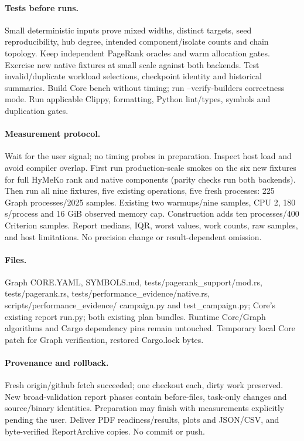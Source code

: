 \documentclass[11pt]{article}
\begin{document}
\paragraph{Tests before runs.} Small deterministic inputs prove mixed widths,
distinct targets, seed reproducibility, hub degree, intended component/isolate
counts and chain topology. Keep independent PageRank oracles and warm allocation
gates. Exercise new native fixtures at small scale against both backends. Test
invalid/duplicate workload selections, checkpoint identity and historical summaries.
Build Core bench without timing; run --verify-builders correctness mode.
Run applicable Clippy, formatting, Python lint/types, symbols and duplication gates.
\paragraph{Measurement protocol.} Wait for the user signal; no timing probes in
preparation. Inspect host load and avoid compiler overlap. First run production-scale
smokes on the six new fixtures for full HyMeKo rank and native components (parity
checks run both backends). Then run all nine fixtures, five existing operations,
five fresh processes: 225 Graph processes/2025 samples. Existing two warmups/nine
samples, CPU 2, 180 s/process and 16 GiB observed memory cap. Construction adds ten
processes/400 Criterion samples. Report medians, IQR, worst values, work counts,
raw samples, and host limitations. No precision change or result-dependent omission.
\paragraph{Files.} Graph CORE.YAML, SYMBOLS.md, tests/pagerank\_support/mod.rs,
tests/pagerank.rs, tests/performance\_evidence/native.rs, scripts/performance\_evidence/
campaign.py and test\_campaign.py; Core's existing report run.py; both existing plan
bundles. Runtime Core/Graph algorithms and Cargo dependency pins remain untouched.
Temporary local Core patch for Graph verification, restored Cargo.lock bytes.
\paragraph{Provenance and rollback.} Fresh origin/github fetch succeeded; one
checkout each, dirty work preserved. New broad-validation report phases contain
before-files, task-only changes and source/binary identities. Preparation may finish
with measurements explicitly pending the user. Deliver PDF readiness/results,
plots and JSON/CSV, and byte-verified ReportArchive copies. No commit or push.
\end{document}
